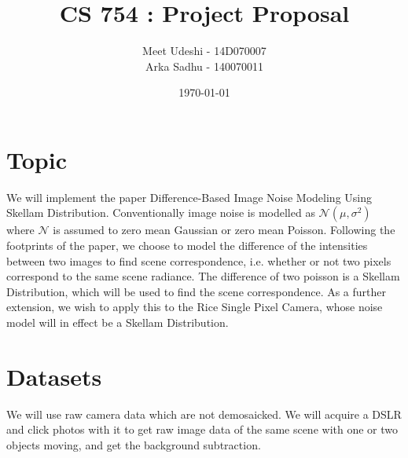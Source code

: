\documentclass{article}
\title{CS 754 : Project Proposal}
\author{Meet Udeshi - 14D070007\\
  Arka Sadhu - 140070011\\
}
\date{\today}
\begin{document}
\maketitle
\section*{Topic}
We will implement the paper Difference-Based Image Noise Modeling Using Skellam Distribution. Conventionally image noise is modelled as $\mathcal{N}(\mu,\sigma^2)$ where $\mathcal{N}$ is assumed to zero mean Gaussian or zero mean Poisson. Following the footprints of the paper, we choose to model the difference of the intensities between two images to find scene correspondence, i.e. whether or not two pixels correspond to the same scene radiance. The difference of two poisson is a Skellam Distribution, which will be used to find the scene correspondence. As a further extension, we wish to apply this to the Rice Single Pixel Camera, whose noise model will in effect be a Skellam Distribution.

\section*{Datasets}
We will use raw camera data which are not demosaicked. We will acquire a DSLR and click photos with it to get raw image data of the same scene with one or two objects moving, and get the background subtraction. 
\end{document}
